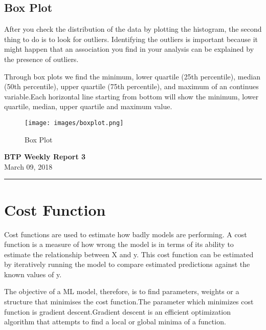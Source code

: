 \documentclass[11pt,letterpaper]{article}
\begin{document}
\subsection*{Box Plot}
After you check the distribution of the data by plotting the histogram, the second thing to do is to look for outliers. Identifying the outliers is important because it might happen that an association you find in your analysis can be explained by the presence of outliers.


Through box plots we find the minimum, lower quartile (25th percentile), median (50th percentile), upper quartile (75th percentile), and maximum of an continues variable.Each horizontal line starting from bottom will show the minimum, lower quartile, median, upper quartile and maximum value.


\begin{figure}[ht]
\centering
\label{fig:boxplot}
\graphicspath{ {images/} }
\texttt{[image: images/boxplot.png]}
\caption{Box Plot}
\end{figure}



\bigskip
\bigskip

\newpage
\pagestyle{plain}

\begin{center}\vspace{-1cm}
\textbf{ \large BTP Weekly Report 3}\\
March 09, 2018
\end{center}

 
\rule{\linewidth}{0.1mm}
\bigskip


\section*{Cost Function}
Cost functions are used to estimate how badly models are performing. A cost function is a measure of how wrong the model is in terms of its ability to estimate the relationship between X and y. This cost function can be estimated by iteratively running the model to compare estimated predictions against the known values of y.

 The objective of a ML model, therefore, is to find parameters, weights or a structure that minimises the cost function.The parameter which minimizes cost function is gradient descent.Gradient descent is an efficient optimization algorithm that attempts to find a local or global minima of a function.
\end{document}

